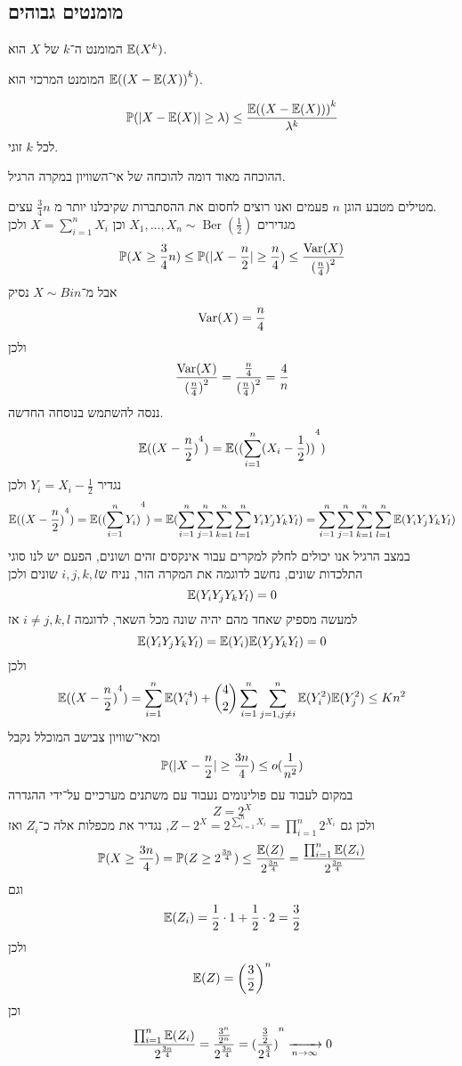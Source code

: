\subsection{מומנטים גבוהים}
\begin{definition}[מומנט]
	המומנט ה־$k$ של $X$ הוא $\mathbb{E}(X^k)$.
\end{definition}
\begin{definition}
	המומנט המרכזי הוא $\mathbb{E}({(X - \mathbb{E}(X))}^k)$.
\end{definition}
\begin{proposition}
	\[
		\mathbb{P}(|X - \mathbb{E}(X)| \ge \lambda) \le \frac{\mathbb{E}({(X - \mathbb{E}(X)))}^k}{\lambda^k}
	\]
	לכל $k$ זוגי.
\end{proposition}
ההוכחה מאוד דומה להוכחה של אי־השוויון במקרה הרגיל.
\begin{example}
	מטילים מטבע הוגן $n$ פעמים ואנו רוצים לחסום את ההסתברות שקיבלנו יותר מ $\frac{3}{4}n$ עצים. \\
	מגדירים $X_1, \dots, X_n \sim \operatorname{Ber}(\frac{1}{2})$ וכן $X = \sum_{i = 1}^n X_i$ ולכן
	\[
		\mathbb{P}(X \ge \frac{3}{4}n)
		\le \mathbb{P}(|X - \frac{n}{2}| \ge \frac{n}{4})
		\le \frac{\operatorname{Var}(X)}{{(\frac{n}{4})}^2}
	\]
	אבל מ־$X \sim Bin$ נסיק
	\[
		\operatorname{Var}(X) = \frac{n}{4}
	\]
	ולכן
	\[
		\frac{\operatorname{Var}(X)}{{(\frac{n}{4})}^2}
		= \frac{\frac{n}{4}}{{(\frac{n}{4})}^2}
		= \frac{4}{n}
	\]
	ננסה להשתמש בנוסחה החדשה.
	\[
		\mathbb{E}({(X - \frac{n}{2})}^4)
		= \mathbb{E}({(\sum_{i = 1}^{n}  (X_i - \frac{1}{2}))}^4)
	\]
	נגדיר $Y_i = X_i - \frac{1}{2}$ ולכן
	\[
		\mathbb{E}({(X - \frac{n}{2})}^4)
		= \mathbb{E}({(\sum_{i = 1}^{n} Y_i)}^4)
		= \mathbb{E}(\sum_{i = 1}^{n} \sum_{j = 1}^{n} \sum_{k = 1}^{n} \sum_{l = 1}^{n} Y_i Y_j Y_k Y_l)
		= \sum_{i = 1}^{n} \sum_{j = 1}^{n} \sum_{k = 1}^{n} \sum_{l = 1}^{n} \mathbb{E}(Y_i Y_j Y_k Y_l)
	\]
	במצב הרגיל אנו יכולים לחלק למקרים עבור אינקסים זהים ושונים, הפעם יש לנו סוגי התלכדות שונים, נחשב לדוגמה את המקרה הזר, נניח ש$i, j, k, l$ שונים ולכן
	\[
		\mathbb{E}(Y_i Y_j Y_k Y_l) = 0
	\]
	למעשה מספיק שאחד מהם יהיה שונה מכל השאר, לדוגמה $i \ne j, k, l$ אז
	\[
		\mathbb{E}(Y_i Y_j Y_k Y_l)
		= \mathbb{E}(Y_i) \mathbb{E}(Y_j Y_k Y_l)
		= 0
	\]
	ולכן
	\[
		\mathbb{E}({(X - \frac{n}{2})}^4)
		= \sum_{i = 1}^{n} \mathbb{E}(Y_i^4)
		+ \binom{4}{2} \sum_{i = 1}^{n} \sum_{j = 1, j \ne i}^{n} \mathbb{E}(Y_i^2) \mathbb{E}(Y_j^2)
		\le K n^2
	\]
	ומאי־שוויון צבישב המוכלל נקבל
	\[
		\mathbb{P}(|X - \frac{n}{2}| \ge \frac{3n}{4})
		\le o(\frac{1}{n^2})
	\]
	במקום לעבוד עם פולינומים נעבוד עם משתנים מערכיים על־ידי ההגדרה
	\[
		Z = 2^X
	\]
	ולכן גם $Z - 2^X = 2^{\sum_{i = 1}^{n} X_i} = \prod_{i = 1}^n 2^{X_i}$, נגדיר את מכפלות אלה כ־$Z_i$ ואז
	\[
		\mathbb{P}(X \ge \frac{3n}{4})
		= \mathbb{P}(Z \ge 2^{\frac{3n}{4}})
		\le \frac{\mathbb{E}(Z)}{2^{\frac{3n}{4}}}
		= \frac{\prod_{i = 1}^n \mathbb{E}(Z_i)}{2^{\frac{3n}{4}}}
	\]
	וגם
	\[
		\mathbb{E}(Z_i) = \frac{1}{2} \cdot 1 + \frac{1}{2} \cdot 2 = \frac{3}{2}
	\]
	ולכן
	\[
		\mathbb{E}(Z) = {\left(\frac{3}{2}\right)}^n
	\]
	וכן
	\[
		\frac{\prod_{i = 1}^n \mathbb{E}(Z_i)}{2^{\frac{3n}{4}}}
		= \frac{\frac{3^n}{2^n}}{2^{\frac{3n}{4}}}
		= {(\frac{\frac{3}{2}}{2^{\frac{3}{4}}})}^n
		\xrightarrow[n \to \infty]{} 0
	\]
\end{example}
